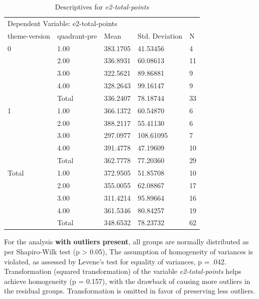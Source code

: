 	\begin{table}[]
		\centering
		\begin{tabular}{ll|lll}
			\multicolumn{5}{l}{Dependent Variable:   e2-total-points}    \\
			theme-version & quadrant-pre & Mean     & Std. Deviation 			& N  \\ \hline
				0            & 1.00         & 383.1705 		& 41.53456       	& 4  \\
							& 2.00           & 336.8931 	& 60.08613       & 11 \\
							& 3.00           & 322.5621 	& 89.86881       & 9  \\
							& 4.00           & 328.2643 	& 99.16147       & 9  \\
							& Total          & 336.2407 	& 78.18744       & 33 \\ \hline
				1            & 1.00           & 366.1372 	& 60.54870       	& 6  \\
							& 2.00           & 388.2117 	& 55.41130       & 6  \\
							& 3.00           & 297.0977 	& 108.61095      & 7  \\
							& 4.00           & 391.4778 	& 47.19609       & 10 \\
							& Total          & 362.7778 	& 77.20360       & 29 \\ \hline
			Total        	& 1.00         	& 372.9505		 & 51.85708       	& 10 \\
							& 2.00           & 355.0055 	& 62.08867       & 17 \\
							& 3.00           & 311.4214 	& 95.89664       & 16 \\
							& 4.00           & 361.5346 	& 80.84257       & 19 \\
							& Total          & 348.6532 	& 78.23732       & 62
		\end{tabular}
		\caption{Descriptives for \textit{e2-total-points}}
		\label{tbl:h2e2-descriptives}
	\end{table}

	For the analysis \textbf{with outliers present}, all groups are normally distributed as per Shapiro-Wilk test (p > 0.05), The assumption of homogeneity of variances is violated, as assessed by Levene's test for equality of variances, p = .042. Transformation (squared transformation) of the variable \textit{e2-total-points} helps achieve homogeneity (p = 0.157), with the drawback of causing more outliers in the residual groups. Transformation is omitted in favor of preserving less outliers.
	
